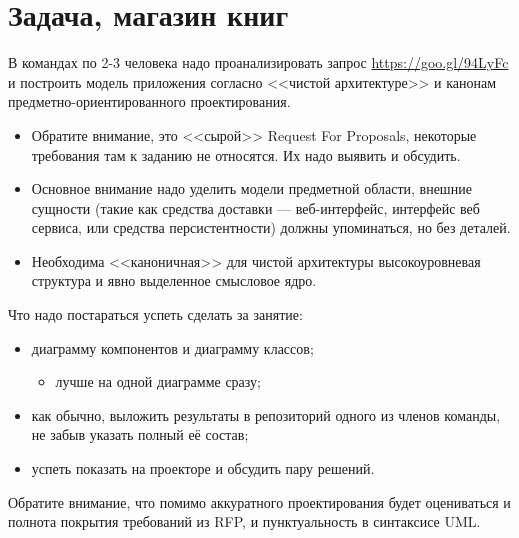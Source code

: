 \documentclass{../mcstext}
\begin{document}
\maketitle
\thispagestyle{empty}

\section{Задача, магазин книг}

В командах по 2-3 человека надо проанализировать запрос \url{ https://goo.gl/94LyFc} и построить модель приложения согласно <<чистой архитектуре>> и канонам предметно-ориентированного проектирования.

\begin{itemize}
    \item Обратите внимание, это <<сырой>> Request For Proposals, некоторые требования там к заданию не относятся. Их надо выявить и обсудить.
    \item Основное внимание надо уделить модели предметной области, внешние сущности (такие как средства доставки --- веб-интерфейс, интерфейс веб сервиса, или средства персистентности) должны упоминаться, но без деталей.
    \item Необходима <<каноничная>> для чистой архитектуры высокоуровневая структура и явно выделенное смысловое ядро.
\end{itemize}

Что надо постараться успеть сделать за занятие:

\begin{itemize}
    \item диаграмму компонентов и диаграмму классов;
    \begin{itemize}
        \item лучше на одной диаграмме сразу;
    \end{itemize}
    \item как обычно, выложить результаты в репозиторий одного из членов команды, не забыв указать полный её состав;
    \item успеть показать на проекторе и обсудить пару решений.
\end{itemize}

Обратите внимание, что помимо аккуратного проектирования будет оцениваться и полнота покрытия требований из RFP, и пунктуальность в синтаксисе UML.
\end{document}
